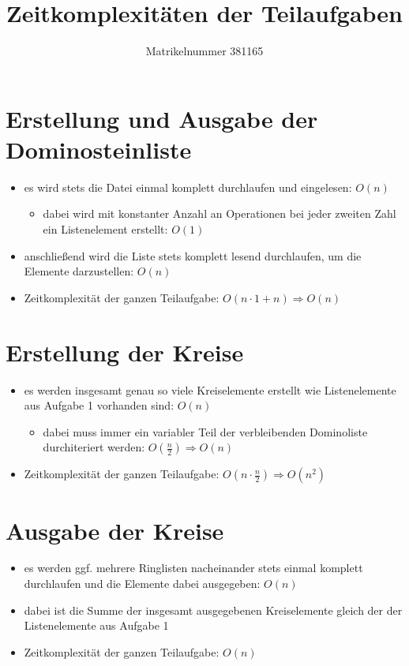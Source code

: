 \documentclass[a4paper,11pt]{scrartcl}
\title{Zeitkomplexitäten der Teilaufgaben}
\author{Matrikelnummer 381165}
\begin{document}
    
    \maketitle
    
    \section{Erstellung und Ausgabe der Dominosteinliste}
    
    \begin{itemize}
        \item es wird stets die Datei einmal komplett durchlaufen und eingelesen: $O(n)$
        \begin{itemize}
            \item dabei wird mit konstanter Anzahl an Operationen bei jeder zweiten Zahl ein Listenelement erstellt: $O(1)$
        \end{itemize}
        \item anschließend wird die Liste stets komplett lesend durchlaufen, um die Elemente darzustellen: $O(n)$
        \item Zeitkomplexität der ganzen Teilaufgabe: $O(n \cdot 1 + n) \Rightarrow{} O(n)$
    \end{itemize}
    
    \section{Erstellung der Kreise}
    
    \begin{itemize}
        \item es werden insgesamt genau so viele Kreiselemente erstellt wie Listenelemente aus Aufgabe 1 vorhanden sind: $O(n)$
        \begin{itemize}
            \item dabei muss immer ein variabler Teil der verbleibenden Dominoliste durchiteriert werden: $O(\frac{n}{2}) \Rightarrow{} O(n)$
        \end{itemize}

        \item Zeitkomplexität der ganzen Teilaufgabe: $O(n \cdot \frac{n}{2}) \Rightarrow{} O(n^2)$
    \end{itemize}
    
    \section{Ausgabe der Kreise}
    
    \begin{itemize}
        \item  es werden ggf. mehrere Ringlisten nacheinander stets einmal komplett durchlaufen und die Elemente dabei ausgegeben: $O(n)$
        \item dabei ist die Summe der insgesamt ausgegebenen Kreiselemente gleich der der Listenelemente aus Aufgabe 1
        \item Zeitkomplexität der ganzen Teilaufgabe: $O(n)$
    \end{itemize}
    
\end{document}
